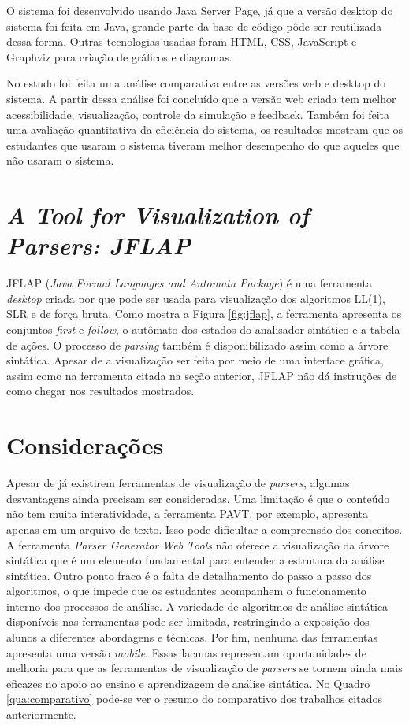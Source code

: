 O sistema foi desenvolvido usando Java Server Page, já que a versão desktop do sistema foi feita em Java, grande parte da base de código pôde ser reutilizada dessa forma. Outras tecnologias usadas foram HTML, CSS, JavaScript e Graphviz para criação de gráficos e diagramas.

No estudo foi feita uma análise comparativa entre as versões web e desktop do sistema. A partir dessa análise foi concluído que a versão web criada tem melhor acessibilidade, visualização, controle da simulação e feedback. Também foi feita uma avaliação quantitativa da eficiência do sistema, os resultados mostram que os estudantes que usaram o sistema tiveram melhor desempenho do que aqueles que não usaram o sistema.


\section{\textit{A Tool for Visualization of Parsers: JFLAP}}
JFLAP (\textit{Java Formal Languages and Automata Package}) é uma ferramenta \textit{desktop} criada por \textcite{jflap} que pode ser usada para visualização dos algoritmos LL(1), SLR e de força bruta. Como mostra a Figura \ref{fig:jflap}, a ferramenta apresenta os conjuntos \textit{first} e \textit{follow}, o autômato dos estados do analisador sintático e a tabela de ações. O processo de \textit{parsing} também é disponibilizado assim como a árvore sintática. Apesar de a visualização ser feita por meio de uma interface gráfica, assim como na ferramenta citada na seção anterior, JFLAP não dá instruções de como chegar nos resultados mostrados.

\section{Considerações}
Apesar de já existirem ferramentas de visualização de \textit{parsers}, algumas desvantagens ainda precisam ser consideradas. Uma limitação é que o conteúdo não tem muita interatividade, a ferramenta PAVT, por exemplo, apresenta apenas em um arquivo de texto. Isso pode dificultar a compreensão dos conceitos. A ferramenta \textit{Parser Generator Web Tools} não oferece a visualização da árvore sintática que é um elemento fundamental para entender a estrutura da análise sintática. Outro ponto fraco é a falta de detalhamento do passo a passo dos algoritmos, o que impede que os estudantes acompanhem o funcionamento interno dos processos de análise. A variedade de algoritmos de análise sintática disponíveis nas ferramentas pode ser limitada, restringindo a exposição dos alunos a diferentes abordagens e técnicas. Por fim, nenhuma das ferramentas apresenta uma versão \textit{mobile}. Essas lacunas representam oportunidades de melhoria para que as ferramentas de visualização de \textit{parsers} se tornem ainda mais eficazes no apoio ao ensino e aprendizagem de análise sintática. No Quadro \ref{qua:comparativo} pode-se ver o resumo do comparativo dos trabalhos citados anteriormente.

